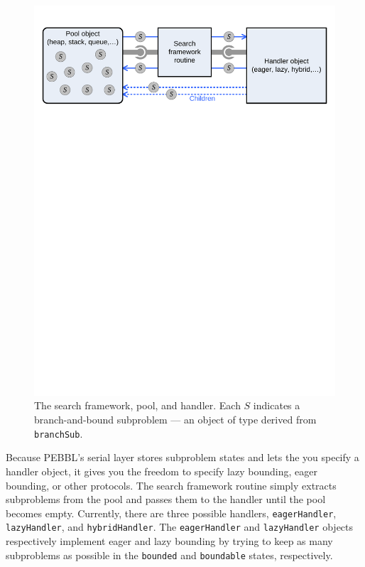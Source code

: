 \begin{figure}[tbp]
\begin{center}
\includegraphics[width=\textwidth]{framework}
\vspace{-0.5in}
\end{center}
\caption{The search framework, pool, and handler.  Each $S$
indicates a branch-and-bound subproblem --- an object of type derived
from \texttt{branchSub}.}
\label{fig:poolandhandler}
\end{figure}

Because PEBBL's serial layer stores subproblem states and lets the
you specify a handler object, it gives you the freedom to specify
lazy bounding, eager bounding, or other protocols.  The search
framework routine simply extracts subproblems from the pool and passes
them to the handler until the pool becomes empty.  Currently, there
are three possible handlers, \texttt{eagerHandler},
\texttt{lazyHandler}, and \texttt{hybridHandler}.  The
\texttt{eagerHandler} and \texttt{lazyHandler} 
objects respectively implement eager
and lazy bounding by trying to keep as many subproblems
as possible in the \texttt{bounded} and \texttt{boundable} states,
respectively.

